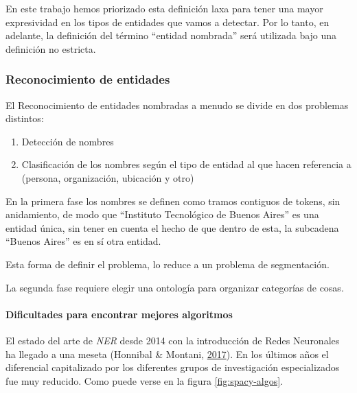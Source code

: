 \documentclass[12pt,a4paper,]{scrartcl}
\providecommand{\tightlist}{%
  \setlength{\itemsep}{0pt}\setlength{\parskip}{0pt}}
\let\oldparagraph\paragraph
\renewcommand{\paragraph}[1]{\oldparagraph{#1}\mbox{}}
\begin{document}
En este trabajo hemos priorizado esta definición laxa para tener una mayor expresividad en los tipos de entidades que vamos a detectar. Por lo tanto, en adelante, la definición del término \enquote{entidad nombrada} será utilizada bajo una definición no estricta.

\hypertarget{reconocimiento-de-entidades}{%
\subsubsection{Reconocimiento de entidades}\label{reconocimiento-de-entidades}}

El Reconocimiento de entidades nombradas a menudo se divide en dos problemas distintos:

\begin{enumerate}
\def\labelenumi{\arabic{enumi}.}
\tightlist
\item
  Detección de nombres
\item
  Clasificación de los nombres según el tipo de entidad al que hacen referencia a (persona, organización, ubicación y otro)
\end{enumerate}

En la primera fase los nombres se definen como tramos contiguos de tokens, sin anidamiento, de modo que \enquote{Instituto Tecnológico de Buenos Aires} es una entidad única, sin tener en cuenta el hecho de que dentro de esta, la subcadena \enquote{Buenos Aires} es en sí otra entidad.

Esta forma de definir el problema, lo reduce a un problema de segmentación.

La segunda fase requiere elegir una ontología para organizar categorías de cosas.

\hypertarget{dificultades-para-encontrar-mejores-algoritmos}{%
\paragraph{Dificultades para encontrar mejores algoritmos}\label{dificultades-para-encontrar-mejores-algoritmos}}

El estado del arte de \emph{NER} desde 2014 con la introducción de Redes Neuronales ha llegado a una meseta (Honnibal \& Montani, \protect\hyperlink{ref-honnibal_NER}{2017}). En los últimos años el diferencial capitalizado por los diferentes grupos de investigación especializados fue muy reducido. Como puede verse en la figura \ref{fig:spacy-algos}.
\end{document}
